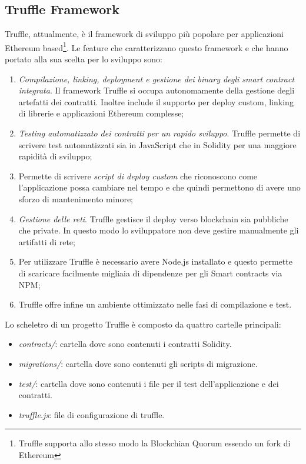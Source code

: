 \subsection{Truffle Framework}
%
Truffle, attualmente, è il framework di sviluppo più popolare per applicazioni Ethereum based\footnote{Truffle supporta allo stesso modo la Blockchian Quorum essendo un fork di Ethereum}. Le feature che caratterizzano questo framework e che hanno portato alla sua scelta per lo sviluppo sono:
\begin{enumerate}
	\item \emph{Compilazione, linking, deployment e gestione dei binary degli smart contract integrata}. Il framework Truffle si occupa autonomamente della gestione degli artefatti dei contratti. Inoltre include il supporto per deploy custom, linking di librerie e applicazioni Ethereum complesse;
	\item \emph{Testing automatizzato dei contratti per un rapido sviluppo}. Truffle permette di scrivere test automatizzati sia in JavaScript che in Solidity per una maggiore rapidità di sviluppo;
	\item Permette di scrivere \emph{script di deploy custom} che riconoscono come l'applicazione possa cambiare nel tempo e che quindi permettono di avere uno sforzo di mantenimento minore;
	\item \emph{Gestione delle reti}. Truffle gestisce il deploy verso blockchain sia pubbliche che private. In questo modo lo sviluppatore non deve gestire manualmente gli artifatti di rete;
	\item Per utilizzare Truffle è necessario avere Node.js installato e questo permette di scaricare facilmente migliaia di dipendenze per gli Smart contracts via NPM;
	\item Truffle offre infine un ambiente ottimizzato nelle fasi di compilazione e test.
\end{enumerate}
Lo scheletro di un progetto Truffle è composto da quattro cartelle principali:
\begin{itemize}
	\item \emph{contracts/}: cartella dove sono contenuti i contratti Solidity.
	\item \emph{migrations/}: cartella dove sono contenuti gli scripts di migrazione.
	\item \emph{test/}: cartella dove sono contenuti i file per il test dell'applicazione e dei contratti.
	\item \emph{truffle.js}: file di configurazione di truffle.
\end{itemize}%
